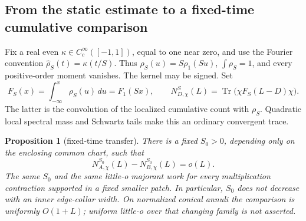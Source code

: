 \documentclass[11pt]{amsart}
\numberwithin{equation}{section}
\newtheorem{proposition}[theorem]{Proposition}
\theoremstyle{remark}
\newcommand{\Tr}{\operatorname{Tr}}
\begin{document}
\subsection{From the static estimate to a fixed-time cumulative comparison}
Fix a real even $\kappa\in C_c^\infty([-1,1])$, equal to one near zero, and use the Fourier convention $\widehat\rho_S(t)=\kappa(t/S)$. Thus $\rho_S(u)=S\rho_1(Su)$, $\int\rho_S=1$, and every positive-order moment vanishes. The kernel may be signed. Set
\begin{equation}\label{eq:FS}
F_S(x)=\int_{-\infty}^x\rho_S(u)\,du=F_1(Sx),\qquad N^S_{D,\chi}(L)=\Tr\big(\chi F_S(L-D)\chi\big) .
\end{equation}
The latter is the convolution of the localized cumulative count with $\rho_S$. Quadratic local spectral mass and Schwartz tails make this an ordinary convergent trace.

\begin{proposition}[fixed-time transfer]\label{prop:fixedtime}
There is a fixed $S_0>0$, depending only on the enclosing common chart, such that
\begin{equation}\label{eq:fixedtime}
N^{S_0}_{A,\chi}(L)-N^{S_0}_{B,\chi}(L)=o(L) .
\end{equation}
The same $S_0$ and the same little-o majorant work for every multiplication contraction supported in a fixed smaller patch. In particular, $S_0$ does not decrease with an inner edge-collar width. On normalized conical annuli the comparison is uniformly $O(1+L)$; uniform little-o over that changing family is not asserted.
\end{proposition}
\end{document}
